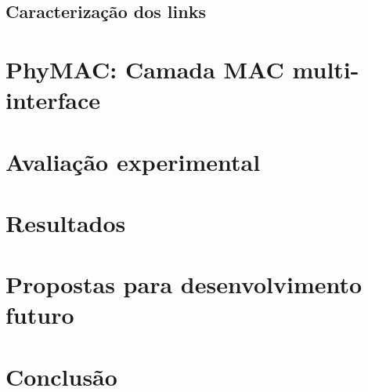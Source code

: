 \documentclass[
	12pt,				%
	openright,			%
	oneside,
	a4paper,			%
	english,			%
	french,				%
	spanish,			%
	brazil				%
	]{abntex2}
\begin{document}
\section{Caracterização dos links}

\chapter{PhyMAC: Camada MAC multi-interface} \label{phymac}

\chapter{Avaliação experimental}
\chapter{Resultados}
\chapter{Propostas para desenvolvimento futuro}


\chapter{Conclusão}

\postextual



%
%

\end{document}

